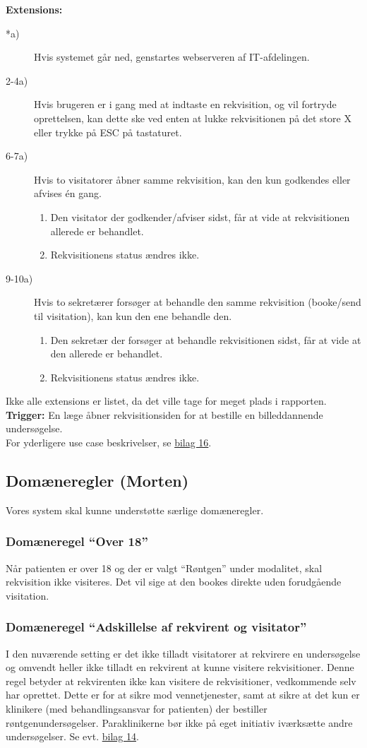 \textbf{Extensions:}
\begin{description}
\item[*a)]Hvis systemet går ned, genstartes webserveren af IT-afdelingen.
\item[2-4a)]Hvis brugeren er i gang med at indtaste en rekvisition, og vil
fortryde oprettelsen, kan dette ske ved enten at lukke rekvisitionen på det
store X eller trykke på ESC på tastaturet.
\item[6-7a)]Hvis to visitatorer åbner samme rekvisition, kan den kun godkendes
eller afvises én gang.
\begin{enumerate}
  \item Den visitator der godkender/afviser sidst, får at vide at rekvisitionen
  allerede er behandlet.
  \item Rekvisitionens status ændres ikke.
\end{enumerate}
\item[9-10a)] Hvis to sekretærer forsøger at behandle den samme rekvisition
(booke/send til visitation), kan kun den ene behandle den.
\begin{enumerate}
  \item Den sekretær der forsøger at behandle rekvisitionen sidst, får at vide
  at den allerede er behandlet.
  \item Rekvisitionens status ændres ikke.
\end{enumerate}
\end{description}
Ikke alle extensions er listet, da det ville tage for meget plads i rapporten.
\textbf{Trigger:} En læge åbner rekvisitionsiden for at bestille en
billeddannende undersøgelse.\\
\indent For yderligere use case beskrivelser, se \hyperref[Bilag16]{bilag 16}.
\subsection*{Domæneregler (Morten)}
Vores system skal kunne understøtte særlige domæneregler.
\subsubsection*{Domæneregel “Over 18”}
Når patienten er over 18 og der er valgt “Røntgen” under modalitet, skal
rekvisition ikke visiteres. Det vil sige at den bookes direkte uden forudgående visitation.
\subsubsection*{Domæneregel “Adskillelse af rekvirent og visitator”}
I den nuværende setting er det ikke tilladt visitatorer at rekvirere en
undersøgelse og omvendt heller ikke tilladt en rekvirent at kunne visitere
rekvisitioner. Denne regel betyder at rekvirenten ikke kan visitere de
rekvisitioner, vedkommende selv har oprettet. Dette er for at sikre mod
vennetjenester, samt at sikre at det kun er klinikere (med behandlingsansvar for
patienten) der bestiller røntgenundersøgelser. Paraklinikerne bør ikke på eget
initiativ iværksætte andre undersøgelser. Se evt. \hyperref[Bilag14]{bilag 14}.
